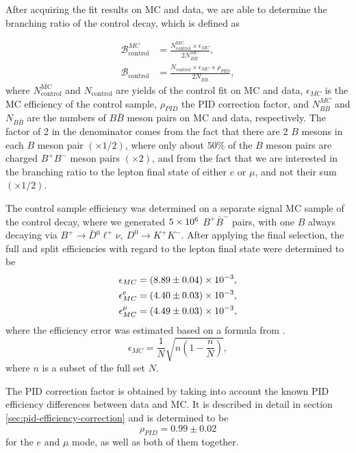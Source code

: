 After acquiring the fit results on MC and data, we are able to determine the branching ratio of the control decay, which is defined as

\begin{align}
\mathcal{B}^{MC}_{\mathrm{control}} &= \frac{N^{\mathrm{MC}}_\mathrm{control} \times \epsilon_{MC}}{2N_{B\bar B}^{MC}},\\
\mathcal{B}_{\mathrm{control}} &= \frac{N_\mathrm{control} \times \epsilon_{MC} \times \rho_{PID}}{2N_{B\bar B}},
\label{eq:br_data}
\end{align}
where $N^{\mathrm{MC}}_\mathrm{control}$ and $N_\mathrm{control}$ are yields of the control fit on MC and data, $\epsilon_{MC}$ is the MC efficiency of the control sample, $\rho_{PID}$ the PID correction factor, and $N_{B\bar B}^{MC}$ and $N_{B\bar B}$ are the numbers of $B \bar B$ meson pairs on MC and data, respectively. The factor of 2 in the denominator comes from the fact that there are 2 $B$ mesons in each $B$ meson pair $(\times 1/2)$, where only about $50\%$ of the $B$ meson pairs are charged $B^+B^-$ meson pairs $(\times 2)$, and from the fact that we are interested in the branching ratio to the lepton final state of either $e$ or $\mu$, and not their sum $(\times 1/2)$.

The control sample efficiency was determined on a separate signal MC sample of the control decay, where we generated $5\times 10^{6}$ $B^+ \bar B^-$ pairs, with one $B$ always decaying via $B^+ \to \bar D {}^0 \ell^+ \nu,~D^0 \to K^+K^-$. After applying the final selection, the full and split efficiencies with regard to the lepton final state were determined to be 
\begin{align*}
\epsilon_{MC} &= (8.89\pm 0.04)\times 10^{-3},\\
\epsilon_{MC}^e &= (4.40\pm 0.03)\times 10^{-3},\\
\epsilon_{MC}^\mu &= (4.49\pm 0.03)\times 10^{-3},
\end{align*}
where the efficiency error was estimated based on a formula from \cite{paterno2004calculating}.
\begin{equation*}
\epsilon_{MC} = \frac{1}{N}\sqrt{n(1-\frac{n}{N})},
\end{equation*}
where $n$ is a subset of the full set $N$.

The PID correction factor is obtained by taking into account the known PID efficiency differences between data and MC. It is described in detail in section \ref{sec:pid-efficiency-correction} and is determined to be
\begin{equation*}
\rho_{PID} = 0.99\pm 0.02
\end{equation*}
for the $e$ and $\mu$ mode, as well as both of them together.

